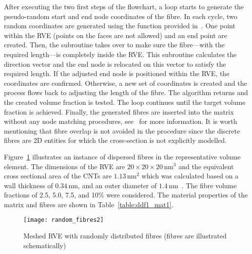 	After executing the two first steps of the flowchart, a loop starts to generate the pseudo-random start and end node coordinates of the fibre. In each cycle, two random coordinates are generated using the  function provided in~\autocite{Javanbakht.2017}. One point within the RVE (points on the faces are not allowed) and an end point are created. Then, the  subroutine takes over to make sure the fibre---with the required length---is completely inside the RVE. This subroutine calculates the direction vector and the end node is relocated on this vector to satisfy the required length. If the adjusted end node is positioned within the RVE, the coordinates are confirmed. Otherwise, a new set of coordinates is created and the process flows back to adjusting the length of the fibre. The algorithm returns and the created volume fraction is tested. The loop continues until the target volume fraction is achieved. Finally, the generated fibres are inserted into the matrix without any node matching procedures, see~\autocite{marc.a} for more information. It is worth mentioning that fibre overlap is not avoided in the procedure since the discrete fibres are 2D entities for which the cross-section is not explicitly modelled.\bl

	Figure~\ref{figure:mesh1} illustrates an instance of dispersed fibres in the representative volume element. The dimensions of the RVE are $20\times20\times20\,\text{nm}^3$ and the equivalent cross sectional area of the CNTs are $1.13\,\text{nm}^2$ which was calculated based on a wall thickness of $0.34\,\text{nm}$, and an outer diameter of $1.4\,\text{nm}$~\autocite{Makvandi.2014}. The fibre volume fractions of 2.5, 5.0, 7.5, and 10\% were considered. The material properties of the matrix and fibres are shown in Table~\ref{table:ddf1_mat1}.

	\begin{figure}[t]
	\centering
	\texttt{[image: random\_fibres2]}
	\caption{Meshed RVE with randomly distributed fibres (fibres are illustrated schematically)}\label{figure:mesh1}
	\end{figure}%

